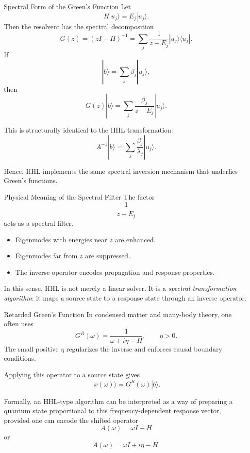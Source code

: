 \documentclass{beamer}
\begin{document}

\begin{frame}{Spectral Form of the Green's Function}
Let
\[
H|u_j\rangle = E_j |u_j\rangle.
\]
Then the resolvent has the spectral decomposition
\[
G(z) = (zI-H)^{-1}
= \sum_j \frac{1}{z-E_j} |u_j\rangle \langle u_j|.
\]
If
\[
|b\rangle = \sum_j \beta_j |u_j\rangle,
\]
then
\[
G(z)|b\rangle = \sum_j \frac{\beta_j}{z-E_j}|u_j\rangle.
\]

This is structurally identical to the HHL transformation:
\[
A^{-1}|b\rangle
=
\sum_j \frac{\beta_j}{\lambda_j}|u_j\rangle.
\]

Hence, HHL implements the same spectral inversion mechanism that underlies Green's functions.
\end{frame}

\begin{frame}{Physical Meaning of the Spectral Filter}
  The factor
  \[
  \frac{1}{z-E_j}
  \]
  acts as a spectral filter.

  \begin{itemize}
  \item Eigenmodes with energies near \(z\) are enhanced.
  \item Eigenmodes far from \(z\) are suppressed.
  \item The inverse operator encodes propagation and response properties.
  \end{itemize}

  In this sense, HHL is not merely a linear solver. It is a \emph{spectral transformation algorithm}:
  it maps a source state to a response state through an inverse operator.
\end{frame}


\begin{frame}{Retarded Green's Function}
  In condensed matter and many-body theory, one often uses
  \[
  G^R(\omega) = \frac{1}{\omega + i\eta - H},
  \qquad \eta > 0.
  \]
  The small positive \(\eta\) regularizes the inverse and enforces causal boundary conditions.

  Applying this operator to a source state gives
  \[
  |x(\omega)\rangle = G^R(\omega)|b\rangle.
  \]

  Formally, an HHL-type algorithm can be interpreted as a way of preparing a quantum state proportional to this frequency-dependent response vector, provided one can encode the shifted operator
  \[
  A(\omega) = \omega I - H
  \]
  or
  \[
  A(\omega) = \omega I + i\eta - H.
  \]
\end{frame}
\end{document}

